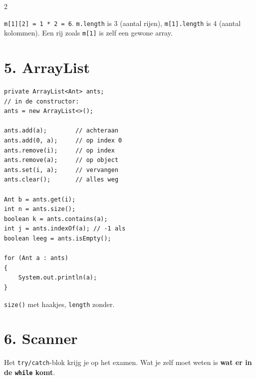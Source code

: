 \documentclass[12pt,a4paper]{extarticle}
\begin{document}
\begin{multicols}{2}
    \begin{center}
    \end{center}
    \vspace{-2mm}
    \texttt{m[1][2] = 1 * 2 = 6}. \quad \texttt{m.length} is 3 (aantal rijen),
    \texttt{m[1].length} is 4 (aantal kolommen). Een rij zoals \texttt{m[1]} is zelf
    een gewone array.

    \section{5. ArrayList}
    \begin{lstlisting}
private ArrayList<Ant> ants;
// in de constructor:
ants = new ArrayList<>();

ants.add(a);        // achteraan
ants.add(0, a);     // op index 0
ants.remove(i);     // op index
ants.remove(a);     // op object
ants.set(i, a);     // vervangen
ants.clear();       // alles weg

Ant b = ants.get(i);
int n = ants.size();
boolean k = ants.contains(a);
int j = ants.indexOf(a); // -1 als
boolean leeg = ants.isEmpty();

for (Ant a : ants)
{
    System.out.println(a);
}
\end{lstlisting}
    \texttt{size()} met haakjes, \texttt{length} zonder.

    \section{6. Scanner}
    Het \texttt{try/catch}-blok krijg je op het examen. Wat je zelf moet weten is
    \textbf{wat er in de \texttt{while} komt}.


\end{multicols}
\end{document}
